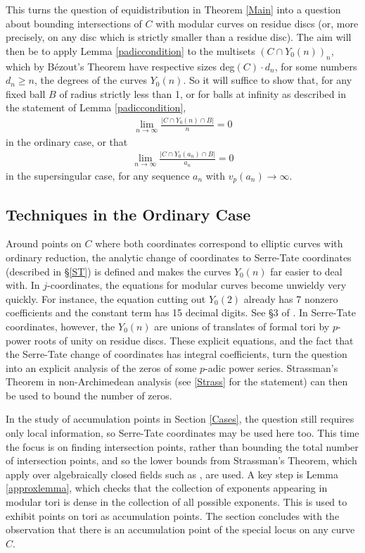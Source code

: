 \documentclass[12pt,letterpaper]{article}
\begin{document}
	
	This turns the question of equidistribution in Theorem \ref{Main} into a question about bounding intersections of $C$ with modular curves on residue discs (or, more precisely, on any disc which is strictly smaller than a residue disc). The aim will then be to apply Lemma \ref{padiccondition} to the multisets $(C\cap Y_0(n))_n$, which by B\'ezout's Theorem have respective sizes deg$(C)\cdot d_n$, for some numbers $d_n\geq n$, the degrees of the curves $Y_0(n)$. So it will suffice to show that, for any fixed ball $B$ of radius strictly less than 1, or for balls at infinity as described in the statement of Lemma \ref{padiccondition},
	\begin{align}\label{ordseq} 
		\lim_{n\to\infty}\frac{|C\cap Y_0(n)\cap B|}{n}= 0\end{align}	
	in the ordinary case, or that 
	\begin{align}\label{ssingsubseq}
		\lim_{n\to\infty}\frac{|C\cap Y_0(a_n)\cap B|}{a_n}= 0\end{align} in the supersingular case, for any sequence $a_n$ with $v_p(a_n)\to \infty$.
	
	
	
	\subsection{Techniques in the Ordinary Case}
	
	 Around points on $C$ where both coordinates correspond to elliptic curves with ordinary reduction, the analytic change of coordinates to Serre-Tate coordinates (described in \S\ref{ST}) is defined and makes the curves $Y_0(n)$ far easier to deal with. In $j$-coordinates, the equations for modular curves become unwieldy very quickly. For instance, the equation cutting out $Y_0(2)$ already has 7 nonzero coefficients and the constant term has 15 decimal digits. See \S3 of \cite{BOS16}. In Serre-Tate coordinates, however, the $Y_0(n)$ are unions of translates of formal tori by $p$-power roots of unity on residue discs. These explicit equations, and the fact that the Serre-Tate change of coordinates has integral coefficients, turn the question into an explicit analysis of the zeros of some $p$-adic power series. Strassman's Theorem in non-Archimedean analysis (see \ref{Strass} for the statement) can then be used to bound the number of zeros.
	
	In the study of accumulation points in Section \ref{Cases}, the question still requires only local information, so Serre-Tate coordinates may be used here too. This time the focus is on finding intersection points, rather than bounding the total number of intersection points, and so the lower bounds from Strassman's Theorem, which apply over algebraically closed fields such as \cp, are used. A key step is Lemma \ref{approxlemma}, which checks that the collection of exponents appearing in modular tori is dense in the collection of all possible exponents. This is used to exhibit points on tori as accumulation points. The section concludes with the observation that there is an accumulation point of the special locus on any curve $C$.
  
\end{document}
